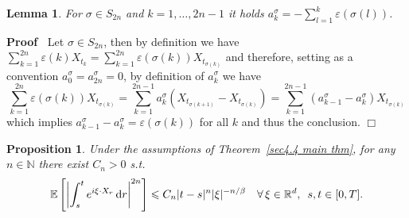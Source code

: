 \documentclass[10pt]{article}
\newcommand{\mathd}{\mathrm{d}}
\newenvironment{proof}{\noindent\textbf{Proof\ }}{\hspace*{\fill}$\Box$\medskip}
\newtheorem{lemma}[theorem]{Lemma}
\newtheorem{proposition}[theorem]{Proposition}
{\theorembodyfont{\rmfamily}\newtheorem{remark}[theorem]{Remark}}
\begin{document}
\begin{lemma}
  \label{sec4.4 combinatorial lemma}For $\sigma \in S_{2 n}$ and $k = 1,
  \ldots, 2 n - 1$ it holds $a_k^{\sigma} = - \sum_{l = 1}^k \varepsilon
  (\sigma (l))$.
\end{lemma}

\begin{proof}
  Let $\sigma \in S_{2 n}$, then by definition we have $\sum_{k = 1}^{2 n}
  \varepsilon (k) X_{t_k} = \sum_{k = 1}^{2 n} \varepsilon (\sigma (k))
  X_{t_{\sigma (k)}}$ and therefore, setting as a convention $a^{\sigma}_0 =
  a^{\sigma}_{2 n} = 0$, by definition of $a^{\sigma}_k$ we have
  \[ \sum_{k = 1}^{2 n} \varepsilon (\sigma (k)) X_{t_{\sigma (k)}} = \sum_{k
     = 1}^{2 n - 1} a_k^{\sigma} (X_{t_{\sigma (k + 1)}} - X_{t_{\sigma (k)}})
     = \sum_{k = 1}^{2 n - 1} (a_{k - 1}^{\sigma} - a_k^{\sigma}) X_{t_{\sigma
     (k)}} \]
  which implies $a_{k - 1}^{\sigma} - a_k^{\sigma} = \varepsilon (\sigma (k))$
  for all $k$ and thus the conclusion.
\end{proof}

\begin{proposition}
  \label{sec4.4 main proposition}Under the assumptions of Theorem~\ref{sec4.4
  main thm}, for any $n \in \mathbb{N}$ there exist $C_n > 0$ s.t.
  \begin{equation}
    \mathbb{E} \left[ \left| \int_s^t e^{i \xi \cdot X_r} \, \mathd r
    \right|^{2 n} \right] \leqslant C_n | t - s |^n  | \xi |^{- n / \beta}
    \quad \forall \, \xi \in \mathbb{R}^d, \hspace{0.5em} s, t \in [0, T] .
  \end{equation}
\end{proposition}
\end{document}
